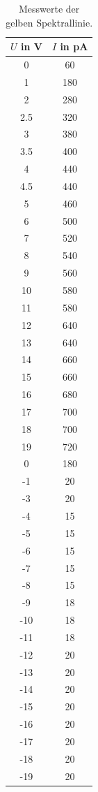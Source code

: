\begin{table}
    \centering 
    \caption{Messwerte der gelben Spektrallinie.}
\begin{tabular}{c c}
    \toprule
    $U$ in V&$I$ in pA \\
    \midrule
    0&60 \\
    1&180 \\
    2&280 \\
  2.5&320 \\
    3&380 \\
  3.5&400 \\
    4&440 \\
  4.5&440 \\
    5&460 \\
    6&500 \\
    7&520 \\
    8&540 \\
    9&560 \\
   10&580 \\
   11&580 \\
   12&640 \\
   13&640 \\
   14&660 \\
   15&660 \\
   16&680 \\
   17&700 \\
   18&700 \\
   19&720 \\
    0&180 \\
    -1&20 \\
    -3&20 \\
    -4&15 \\
    -5&15 \\
    -6&15 \\
    -7&15 \\
    -8&15 \\
    -9&18 \\
   -10&18 \\
   -11&18 \\
   -12&20 \\
   -13&20 \\
   -14&20 \\
   -15&20 \\
   -16&20 \\
   -17&20 \\
   -18&20 \\
   -19&20 \\
    \bottomrule
\end{tabular}
\label{tab:gelb}
\end{table}

